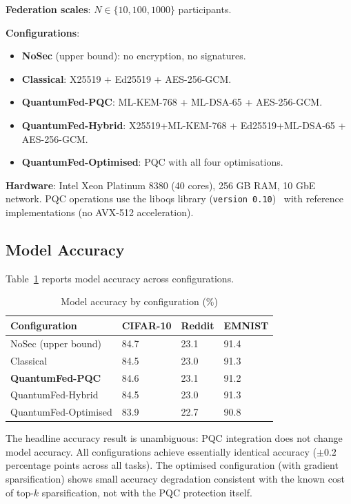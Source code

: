 \documentclass[sigconf,nonacm]{acmart}
\begin{document}
\textbf{Federation scales}: $N \in \{10, 100, 1000\}$ participants.

\textbf{Configurations}:
\begin{itemize}
  \item \textbf{NoSec} (upper bound): no encryption, no signatures.
  \item \textbf{Classical}: X25519 + Ed25519 + AES-256-GCM.
  \item \textbf{QuantumFed-PQC}: ML-KEM-768 + ML-DSA-65 + AES-256-GCM.
  \item \textbf{QuantumFed-Hybrid}: X25519+ML-KEM-768 +
        Ed25519+ML-DSA-65 + AES-256-GCM.
  \item \textbf{QuantumFed-Optimised}: PQC with all four optimisations.
\end{itemize}

\textbf{Hardware}: Intel Xeon Platinum 8380 (40 cores), 256 GB RAM,
10 GbE network. PQC operations use the liboqs library
(\verb|version 0.10|)~\cite{liboqs2024} with reference
implementations (no AVX-512 acceleration).

\subsection{Model Accuracy}

Table~\ref{tab:accuracy} reports model accuracy across configurations.

\begin{table}[h]
\caption{Model accuracy by configuration (\%)}
\label{tab:accuracy}
\small
\begin{tabularx}{\columnwidth}{@{}p{2.6cm}X X X@{}}
\toprule
\textbf{Configuration} & \textbf{CIFAR-10} & \textbf{Reddit} & \textbf{EMNIST} \\
\midrule
NoSec (upper bound)        & 84.7 & 23.1 & 91.4 \\
Classical                  & 84.5 & 23.0 & 91.3 \\
\textbf{QuantumFed-PQC}    & 84.6 & 23.1 & 91.2 \\
QuantumFed-Hybrid          & 84.5 & 23.0 & 91.3 \\
QuantumFed-Optimised       & 83.9 & 22.7 & 90.8 \\
\bottomrule
\end{tabularx}
\end{table}

The headline accuracy result is unambiguous: PQC integration does
not change model accuracy. All configurations achieve essentially
identical accuracy ($\pm 0.2$ percentage points across all tasks).
The optimised configuration (with gradient sparsification) shows
small accuracy degradation consistent with the known cost of
top-$k$ sparsification, not with the PQC protection itself.
\end{document}

